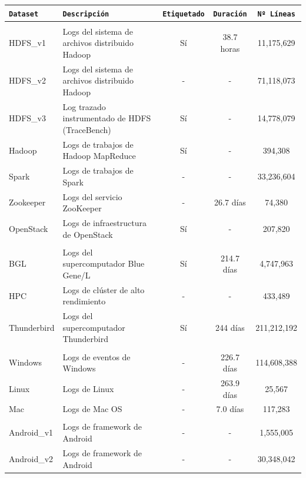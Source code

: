 \newpage

\begin{table}[H] 
\centering
\footnotesize
\begin{tabular}{|l|p{4cm}|c|c|c|}
\hline
\rowcolor{graylight}\texttt{Dataset} & \texttt{Descripción} & \texttt{Etiquetado} & \texttt{Duración} & \texttt{Nº Líneas} \\
\hline
\rowcolor{graylight}\multicolumn{5}{|c|}{\texttt{Sistemas Distribuidos}} \\
\hline
HDFS\_v1 & Logs del sistema de archivos distribuido Hadoop & Sí & 38.7 horas & 11,175,629 \\
\hline
HDFS\_v2 & Logs del sistema de archivos distribuido Hadoop & - & - & 71,118,073 \\
\hline
HDFS\_v3 & Log trazado instrumentado de HDFS (TraceBench) & Sí & - & 14,778,079 \\
\hline
Hadoop & Logs de trabajos de Hadoop MapReduce & Sí & - & 394,308 \\
\hline
Spark & Logs de trabajos de Spark & - & - & 33,236,604 \\
\hline
Zookeeper & Logs del servicio ZooKeeper & - & 26.7 días & 74,380 \\
\hline
OpenStack & Logs de infraestructura de OpenStack & Sí & - & 207,820 \\
\hline
\rowcolor{graylight}\multicolumn{5}{|c|}{\texttt{Supercomputadores}} \\
\hline
BGL & Logs del supercomputador  Blue Gene/L & Sí & 214.7 días & 4,747,963 \\
\hline
HPC & Logs de clúster de alto rendimiento & - & - & 433,489 \\
\hline
Thunderbird & Logs del supercomputador Thunderbird & Sí & 244 días & 211,212,192 \\
\hline
\rowcolor{graylight}\multicolumn{5}{|c|}{\texttt{Sistemas Operativos}} \\
\hline
Windows & Logs de eventos de Windows & - & 226.7 días & 114,608,388 \\
\hline
Linux & Logs de Linux & - & 263.9 días & 25,567 \\
\hline
Mac & Logs de Mac OS & - & 7.0 días & 117,283 \\
\hline
\rowcolor{graylight}\multicolumn{5}{|c|}{\texttt{Sistemas Móviles}} \\
\hline
Android\_v1 & Logs de framework de Android & - & - & 1,555,005 \\
\hline
Android\_v2 & Logs de framework de Android & - & - & 30,348,042 \\

\end{tabular}
\end{table}
